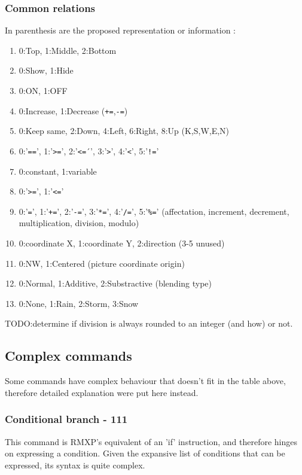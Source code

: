 \documentclass[11pt]{article}
\begin{document}
\newpage
\subsubsection{Common relations}

In parenthesis are the proposed representation or information :
\begin{enumerate}
	\item 0:Top, 1:Middle, 2:Bottom
	\item 0:Show, 1:Hide
	\item 0:ON, 1:OFF
	\item 0:Increase, 1:Decrease (\verb|+=|,\verb|-=|)
	\item 0:Keep same, 2:Down, 4:Left, 6:Right, 8:Up (K,S,W,E,N)
	\item 0:'\verb|==|', 1:'\verb|>=|', 2:'\verb|<=|´', 3:'\verb|>|', 4:'\verb|<|', 5:'\verb|!=|'
	\item 0:constant, 1:variable
	\item 0:'\verb|>=|', 1:'\verb|<=|'
	\item 0:'\verb|=|', 1:'\verb|+=|', 2:'\verb|-=|', 3:'\verb|*=|', 4:'\verb|/=|', 5:'\verb|%=|' (affectation, increment, decrement, multiplication, division, modulo)
	\item 0:coordinate X, 1:coordinate Y, 2:direction (3-5 unused)
	\item 0:NW, 1:Centered (picture coordinate origin)
	\item 0:Normal, 1:Additive, 2:Substractive (blending type)
	
	\item 0:None, 1:Rain, 2:Storm, 3:Snow
\end{enumerate}

TODO:determine if division is always rounded to an integer (and how) or not.


\subsection{Complex commands}

Some commands have complex behaviour that doesn't fit in the table above, therefore detailed explanation were put here instead.


\subsubsection{Conditional branch - 111}
\label{sec:condbranch}

This command is RMXP's equivalent of an 'if' instruction, and therefore hinges on expressing a condition. Given the expansive list of conditions that can be expressed, its syntax is quite complex.
\end{document}
